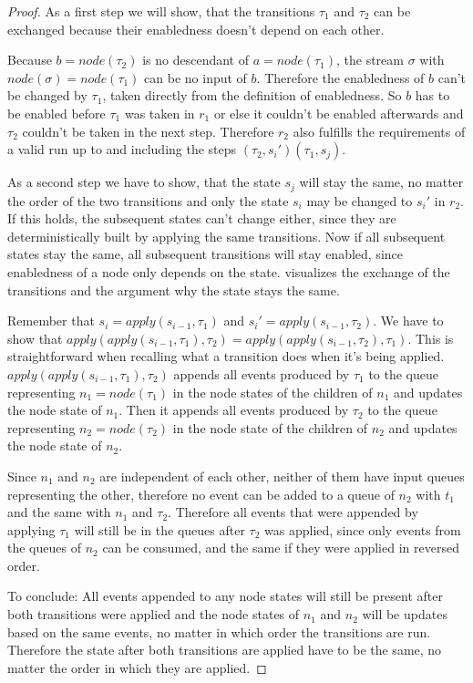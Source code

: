 \begin{proof}
  As a first step we will show, that the transitions \(\tau_1\) and \(\tau_2\) can be exchanged because their enabledness doesn't depend on each other.

  Because \(b = \mathit{node}(\tau_2)\) is no descendant of \(a = \mathit{node}(\tau_1)\), the stream \(\sigma\) with \(\mathit{node}(\sigma) = \mathit{node}(\tau_1)\) can be no input of \(b\).
  Therefore the enabledness of \(b\) can't be changed by \(\tau_1\), taken directly from the definition of enabledness.
  So \(b\) has to be enabled before \(\tau_1\) was taken in \(r_1\) or else it couldn't be enabled afterwards and \(\tau_2\) couldn't be taken in the next step.
  Therefore \(r_2\) also fulfills the requirements of a valid run up to and including the steps \((\tau_2,s_i')(\tau_1,s_j)\).

  As a second step we have to show, that the state \(s_j\) will stay the same, no matter the order of the two transitions and only the state \(s_i\) may be changed to \(s_i'\) in \(r_2\).
  If this holds, the subsequent states can't change either, since they are deterministically built by applying the same transitions.
  Now if all subsequent states stay the same, all subsequent transitions will stay enabled, since enabledness of a node only depends on the state.
   visualizes the exchange of the transitions and the argument why the state stays the same.

  Remember that \(s_i = \mathit{apply}(s_{i-1}, \tau_1)\) and \(s_i' = \mathit{apply}(s_{i-1}, \tau_2)\).
  We have to show that \(\mathit{apply}(\mathit{apply}(s_{i-1}, \tau_1),\tau_2) = \mathit{apply}(\mathit{apply}(s_{i-1}, \tau_2),\tau_1)\).
  This is straightforward when recalling what a transition does when it's being applied.
  \(\mathit{apply}(\mathit{apply}(s_{i-1}, \tau_1),\tau_2)\) appends all events produced by \(\tau_1\) to the queue representing \(n_1 = \mathit{node}(\tau_1)\) in the node states of the children of \(n_1\) and updates the node state of \(n_1\).
  Then it appends all events produced by \(\tau_2\) to the queue representing \(n_2 = \mathit{node}(\tau_2)\) in the node state of the children of \(n_2\) and updates the node state of \(n_2\).

  Since \(n_1\) and \(n_2\) are independent of each other, neither of them have input queues representing the other, therefore no event can be added to a queue of \(n_2\) with \(t_1\) and the same with \(n_1\) and \(\tau_2\).
  Therefore all events that were appended by applying \(\tau_1\) will still be in the queues after \(\tau_2\) was applied, since only events from the queues of \(n_2\) can be consumed, and the same if they were applied in reversed order.

  To conclude: All events appended to any node states will still be present after both transitions were applied and the node states of \(n_1\) and \(n_2\) will be updates based on the same events, no matter in which order the transitions are run.
  Therefore the state after both transitions are applied have to be the same, no matter the order in which they are applied.

\end{proof}

